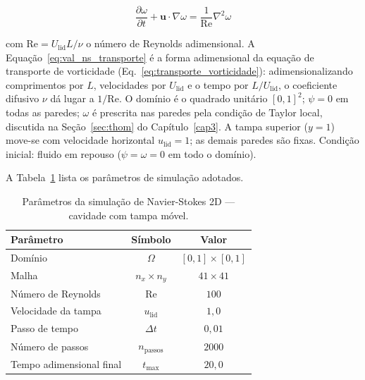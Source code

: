 \begin{equation}
    \frac{\partial \omega}{\partial t} + \mathbf{u} \cdot \nabla \omega = \frac{1}{\mathrm{Re}} \nabla^2 \omega
    \label{eq:val_ns_transporte}
\end{equation}

\noindent com $\mathrm{Re} = U_{\mathrm{lid}} L / \nu$ o número de Reynolds adimensional. A Equação~\eqref{eq:val_ns_transporte} é a forma adimensional da equação de transporte de vorticidade (Eq.~\ref{eq:transporte_vorticidade}): adimensionalizando comprimentos por $L$, velocidades por $U_{\mathrm{lid}}$ e o tempo por $L/U_{\mathrm{lid}}$, o coeficiente difusivo $\nu$ dá lugar a $1/\mathrm{Re}$. O domínio é o quadrado unitário $[0, 1]^2$; $\psi = 0$ em todas as paredes; $\omega$ é prescrita nas paredes pela condição de Taylor local, discutida na Seção~\ref{sec:thom} do Capítulo~\ref{cap3}. A tampa superior ($y = 1$) move-se com velocidade horizontal $u_{\mathrm{lid}} = 1$; as demais paredes são fixas. Condição inicial: fluido em repouso ($\psi = \omega = 0$ em todo o domínio).

A Tabela~\ref{tab:val_ns_params} lista os parâmetros de simulação adotados.

\begin{table}[htbp]
    \centering
    \caption{Parâmetros da simulação de Navier-Stokes 2D --- cavidade com tampa móvel.}
    \label{tab:val_ns_params}
    \begin{tabular}{lcc}
        \hline
        \textbf{Parâmetro} & \textbf{Símbolo} & \textbf{Valor} \\
        \hline
        Domínio                         & $\Omega$      & $[0, 1] \times [0, 1]$ \\
        Malha                           & $n_x \times n_y$ & $41 \times 41$     \\
        Número de Reynolds              & $\mathrm{Re}$ & $100$                  \\
        Velocidade da tampa             & $u_{\mathrm{lid}}$ & $1{,}0$           \\
        Passo de tempo                  & $\Delta t$    & $0{,}01$               \\
        Número de passos                & $n_{\mathrm{passos}}$ & $2000$         \\
        Tempo adimensional final        & $t_{\max}$    & $20{,}0$               \\
        \hline
    \end{tabular}
\end{table}


